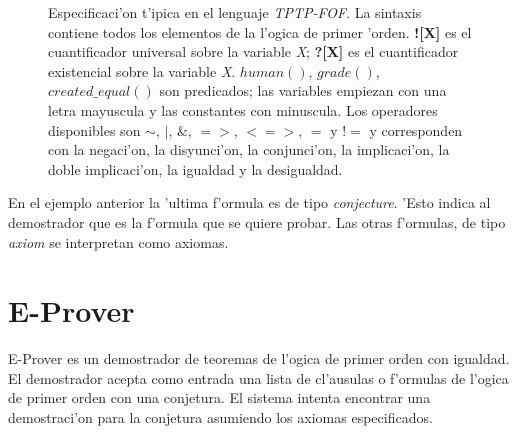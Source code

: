 \begin{figure}[htbp]
\caption{Especificaci'on t'ipica en el lenguaje \textit{TPTP-FOF}. La sintaxis contiene todos los elementos de la l'ogica de primer 'orden. \textbf{![X]} es el cuantificador universal sobre la variable \textit{X}; \textbf{?[X]} es el cuantificador existencial sobre la variable \textit{X}. \textit{$human()$}, \textit{$grade()$}, \textit{$created\_equal()$} son predicados; las variables empiezan con una letra mayuscula y las constantes con minuscula. Los operadores disponibles son $\sim$, $|$, $\&$, $=>$, $<=>$, $=$ y $!=$ y corresponden con la negaci'on, la disyunci'on, la conjunci'on, la implicaci'on, la doble implicaci'on, la igualdad y la desigualdad.}
\end{figure}

En el ejemplo anterior la 'ultima f'ormula es de tipo \textit{conjecture}. 'Esto indica al demostrador que es la f'ormula que se quiere probar. Las otras f'ormulas, de tipo \textit{axiom} se interpretan como axiomas.

\section{E-Prover}

E-Prover es un demostrador de teoremas de l'ogica de primer orden con igualdad. El demostrador acepta como entrada una lista de cl'ausulas o f'ormulas de l'ogica de primer orden con una conjetura. El sistema intenta encontrar una demostraci'on para la conjetura asumiendo los axiomas especificados.

